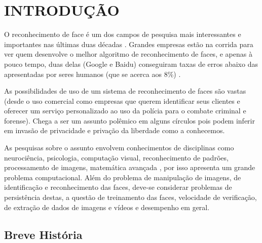 
\chapter{INTRODUÇÃO}\label{ch:introducao}

O reconhecimento de face é um dos campos de pesquisa mais interessantes e importantes nas últimas duas décadas \cite{wei_lun}. Grandes empresas estão na corrida para ver quem desenvolve o melhor algoritmo de reconhecimento de faces, e apenas à pouco tempo, duas delas (Google e Baidu) conseguiram taxas de erros abaixo das apresentadas por seres humanos (que se acerca aos 8\%) \cite{stats_economy_compass_2017}.
 
As possibilidades de uso de um sistema de reconhecimento de faces são vastas (desde o uso comercial como empresas que querem identificar seus clientes e oferecer um serviço personalizado ao uso da polícia para o combate criminal e forense). Chega a ser um assunto polêmico em alguns círculos pois podem inferir em invasão de privacidade e privação da liberdade como a conhecemos.

As pesquisas sobre o assunto envolvem conhecimentos de disciplinas como neurociência, psicologia, computação visual, reconhecimento de padrões, processamento de imagens, matemática avançada \cite{wei_lun}, por isso apresenta um grande problema computacional. Além do problema de manipulação de imagens,  de identificação e reconhecimento das faces, deve-se considerar problemas de persistência destas, a questão de treinamento das faces, velocidade de verificação, de extração de dados de imagens e vídeos e desempenho em geral.


\section{Breve História}\label{sec:historia}

